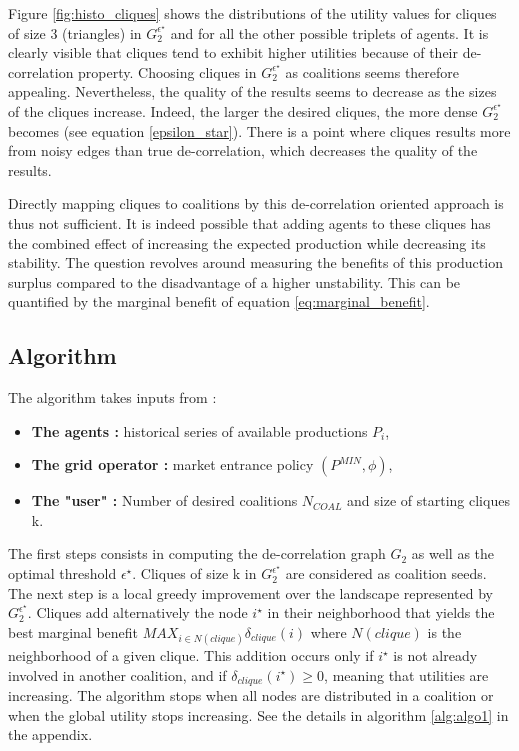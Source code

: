 \documentclass[conference]{IEEEtran}
\begin{document}
Figure \ref{fig:histo_cliques} shows the distributions of the utility values for cliques of size 3 (triangles) in $ G_{2}^{\epsilon^{\star}} $ and for all the other possible triplets of agents. It is clearly visible that cliques tend to exhibit higher utilities because of their de-correlation property. Choosing cliques in $ G_{2}^{\epsilon^{\star}} $ as coalitions seems therefore appealing. Nevertheless, the quality of the results seems to decrease as the sizes of the cliques increase. Indeed, the larger the desired cliques, the more dense $ G_{2}^{\epsilon^{\star}} $ becomes (see equation \ref{epsilon_star}). There is a point where cliques results more from noisy edges than true de-correlation, which decreases the quality of the results.

Directly mapping cliques to coalitions by this de-correlation oriented approach is thus not sufficient. It is indeed possible that adding agents to these cliques has the combined effect of increasing the expected production while decreasing its stability. The question revolves around measuring the benefits of this production surplus compared to the disadvantage of a higher unstability. This can be quantified by the marginal benefit of equation \ref{eq:marginal_benefit}.

\subsection{Algorithm}
The algorithm takes inputs from :

\begin{itemize}
	\item \textbf{The agents :} historical series of available productions $P_{i}$, 
	\item \textbf{The grid operator :} market entrance policy $ (P^{MIN},\phi) $,
	\item \textbf{The "user" :} Number of desired coalitions $ N_{COAL} $ and size of starting cliques k.
\end{itemize} 

The first steps consists in computing the de-correlation graph $ G_{2} $ as well as the optimal threshold $ \epsilon^{\star} $. Cliques of size k in $ G_{2}^{\epsilon^{\star}} $ are considered as coalition seeds. The next step is a local greedy improvement over the landscape represented by  $ G_{2}^{\epsilon^{\star}} $. Cliques add alternatively the node $ i^{\star} $ in their neighborhood that yields the best marginal benefit $ MAX_{ i \in N(clique) } \delta_{clique}(i) $ where $ N(clique) $ is the neighborhood of a given clique. This addition occurs only if $ i^{\star} $ is not already involved in another coalition, and if $ \delta_{clique}(i^{\star}) \geq 0 $, meaning that utilities are increasing. The algorithm stops when all nodes are distributed in a coalition or when the global utility stops increasing. See the details in algorithm \ref{alg:algo1} in the appendix.
\end{document}
